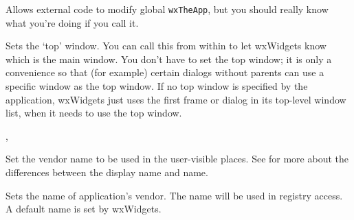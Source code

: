 
Allows external code to modify global \texttt{wxTheApp}, but you should really
know what you're doing if you call it.






\label{wxappsettopwindow}


Sets the `top' window. You can call this from within  to
let wxWidgets know which is the main window. You don't have to set the top window;
it is only a convenience so that (for example) certain dialogs without parents can use a
specific window as the top window. If no top window is specified by the application,
wxWidgets just uses the first frame or dialog in its top-level window list, when it
needs to use the top window.




, 


\label{wxappsetvendordisplayname}


Set the vendor name to be used in the user-visible places. See
 for more about
the differences between the display name and name.


\label{wxappsetvendorname}


Sets the name of application's vendor. The name will be used
in registry access. A default name is set by
wxWidgets.




\label{wxappsetusebestvisual}

